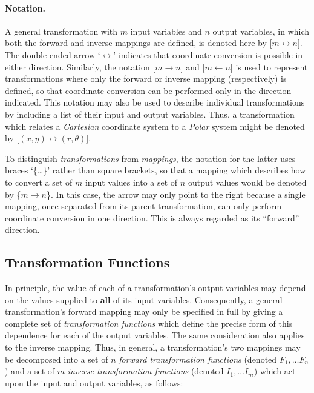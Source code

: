 \documentclass[twoside,11pt]{article}
\newcommand{\xlabel}[1]{}
\renewcommand{\_}{\texttt{\symbol{95}}}
\begin{document}
\paragraph{Notation.}
A general transformation with $m$ input variables and $n$ output variables,
in which both the forward and inverse mappings are defined, is denoted here
by \mbox{[$m \leftrightarrow n$]}.
The double-ended arrow `$\leftrightarrow$' indicates that coordinate
conversion is possible in either direction.
Similarly, the notation \mbox{[$m \rightarrow n$]} and \mbox{[$m \leftarrow
n$]} is used to represent transformations where only the forward or inverse
mapping (respectively) is defined, so that coordinate conversion can be
performed only in the direction indicated.
This notation may also be used to describe individual transformations by
including a list of their input and output variables.
Thus, a transformation which relates a \emph{Cartesian} coordinate system to
a \emph{Polar} system might be denoted by \mbox{[$(x,y) \leftrightarrow
(r,\theta)$]}.

To distinguish \emph{transformations} from \emph{mappings}, the notation for
the latter uses braces `\{\ldots\}' rather than square brackets, so that a
mapping which describes how to convert a set of $m$ input values into a set
of $n$ output values would be denoted by \mbox{\{$m \rightarrow n$\}}.
In this case, the arrow may only point to the right because a single
mapping, once separated from its parent transformation, can only perform
coordinate conversion in one direction.
This is always regarded as its ``forward'' direction.


\subsection{\xlabel{transformation_functions}Transformation Functions}

In principle, the value of each of a transformation's output variables may
depend on the values supplied to \textbf{all} of its input variables.
Consequently, a general transformation's forward mapping may only be
specified in full by giving a complete set of \emph{transformation functions}
which define the precise form of this dependence for each of the output
variables.
The same consideration also applies to the inverse mapping.
Thus, in general, a transformation's two mappings may be decomposed into a
set of $n$ \emph{forward transformation functions} (denoted \mbox{$F_1,\ldots
F_n$}) and a set of $m$ \emph{inverse transformation functions} (denoted
\mbox{$I_1,\ldots I_m$}) which act upon the input and output variables, as
follows:
\end{document}
